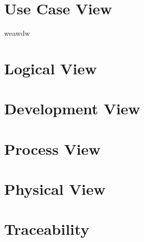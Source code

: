 \documentclass[
    english, %
]{VUMIFPSkursinis}
\begin{document}
\section{Use Case View}


weawdw
\section{Logical View}

\section{Development View}

\section{Process View}

\section{Physical View}

\section{Traceability}

\printbibliography[heading=bibintoc]
\end{document}

